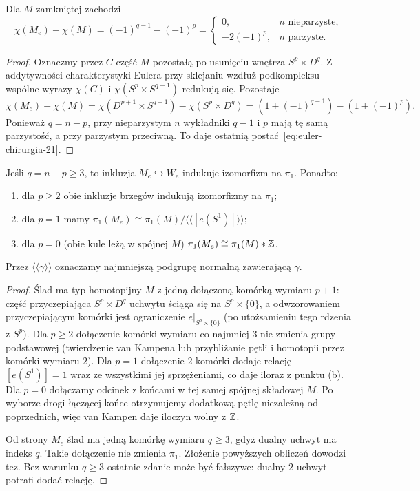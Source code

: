 \begin{stwierdzenie}
\label{prop:euler-chirurgia-21}
Dla $M$ zamkniętej zachodzi
\begin{equation}\label{eq:euler-chirurgia-21}
 \chi(M_e)-\chi(M)
 =(-1)^{q-1}-(-1)^p
 =\begin{cases}
    0,&n\text{ nieparzyste},\\
    -2(-1)^p,&n\text{ parzyste}.
   \end{cases}
\end{equation}
\end{stwierdzenie}
\begin{proof}
Oznaczmy przez $C$ część $M$ pozostałą
po usunięciu wnętrza $S^p\times D^q$.
Z addytywności charakterystyki Eulera przy
sklejaniu wzdłuż podkompleksu wspólne wyrazy
$\chi(C)$ i $\chi(S^p\times S^{q-1})$ redukują się.
Pozostaje
\[
 \chi(M_e)-\chi(M)
 =\chi(D^{p+1}\times S^{q-1})
  -\chi(S^p\times D^q)
 =(1+(-1)^{q-1})-(1+(-1)^p).
\]
Ponieważ $q=n-p$, przy nieparzystym $n$
wykładniki $q-1$ i $p$ mają tę samą parzystość,
a przy parzystym przeciwną. To daje
ostatnią postać~\eqref{eq:euler-chirurgia-21}.
\end{proof}

\begin{twierdzenie}
\label{thm:pi1-chirurgia-21}
Jeśli $q=n-p\geq3$, to inkluzja $M_e\hookrightarrow W_e$
indukuje izomorfizm na $\pi_1$. Ponadto:
\begin{enumerate}[label=(\alph*)]
\item dla $p\geq2$ obie inkluzje brzegów indukują
izomorfizmy na $\pi_1$;
\item dla $p=1$ mamy
$\pi_1(M_e)\cong\pi_1(M)/\langle\!\langle[e(S^1)]\rangle\!\rangle$;
\item dla $p=0$ (obie kule leżą w spójnej $M$)
$\pi_1(M_e)\cong\pi_1(M)*\mathbb{Z}$.
\end{enumerate}
Przez $\langle\!\langle\gamma\rangle\!\rangle$
oznaczamy najmniejszą podgrupę normalną
zawierającą $\gamma$.
\end{twierdzenie}
\begin{proof}
Ślad ma typ homotopijny $M$ z jedną dołączoną
komórką wymiaru $p+1$: część przyczepiająca
$S^p\times D^q$ uchwytu ściąga się na
$S^p\times\{0\}$, a odwzorowaniem przyczepiającym
komórki jest ograniczenie $e|_{S^p\times\{0\}}$
(po utożsamieniu tego rdzenia z $S^p$).
Dla $p\geq2$ dołączenie komórki wymiaru
co najmniej $3$ nie zmienia grupy podstawowej
(twierdzenie van Kampena lub przybliżanie pętli
i homotopii przez komórki wymiaru $2$).
Dla $p=1$ dołączenie $2$-komórki dodaje relację
$[e(S^1)]=1$ wraz ze wszystkimi jej sprzężeniami,
co daje iloraz z punktu (b). Dla $p=0$
dołączamy odcinek z końcami w tej samej spójnej
składowej $M$. Po wyborze drogi łączącej końce
otrzymujemy dodatkową pętlę niezależną od
poprzednich, więc van Kampen daje iloczyn wolny
z $\mathbb{Z}$.

Od strony $M_e$ ślad ma jedną komórkę wymiaru
$q\geq3$, gdyż dualny uchwyt ma indeks $q$.
Takie dołączenie nie zmienia $\pi_1$.
Złożenie powyższych obliczeń dowodzi tez.
Bez warunku $q\geq3$ ostatnie zdanie może być
fałszywe: dualny $2$-uchwyt potrafi dodać relację.
\end{proof}

